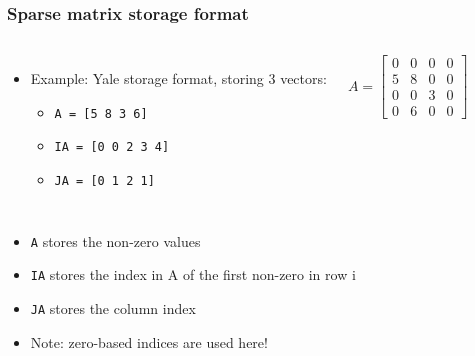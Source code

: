 \documentclass[11pt,table,final,xcolor={usenames,dvipsnames,table}]{beamer}
\begin{document}
\begin{frame}[fragile]
  \frametitle{Sparse matrix storage format}
  \begin{columns}
  \begin{itemize}
    \item Example: Yale storage format, storing 3 vectors:
    \begin{itemize}
      \item \lstinline$A = [5 8 3 6]$
      \item \lstinline$IA = [0 0 2 3 4]$
      \item \lstinline$JA = [0 1 2 1]$
    \end{itemize}
  \end{itemize}
  \[
   A = 
   \begin{bmatrix}
    0 & 0 & 0 & 0\\
    5 & 8 & 0 & 0\\
    0 & 0 & 3 & 0\\
    0 & 6 & 0 & 0
    \end{bmatrix}
  \]
  \end{columns}
  \begin{itemize}
    \item \lstinline$A$ stores the non-zero values
    \item \lstinline$IA$ stores the index in A of the first non-zero in row i
    \item \lstinline$JA$ stores the column index
    \item Note: zero-based indices are used here!
\end{itemize}
\end{frame}
\end{document}
